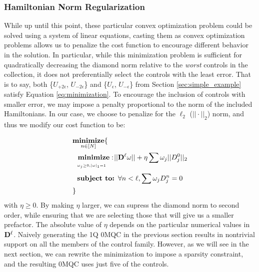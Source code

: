 \documentclass[aps,nofootinbib,pra,notitlepage,twocolumn]{revtex4-1}
\begin{document}


\subsubsection{Hamiltonian Norm Regularization}
\label{sec:norm}
While up until this point, these particular convex optimization problem could be solved using a system of linear equations, casting them as convex optimization problems allows us to penalize the cost function to encourage different behavior in the solution. In particular, while this minimization problem is sufficient for quadratically decreasing the diamond norm relative to the \textit{worst} controls in the collection, it does not preferentially select the controls with the least error. That is to say, both \{$U_{+2\epsilon}$, $U_{-2\epsilon}$\} and \{$U_{\epsilon}$, $U_{-\epsilon}$\} from Section \ref{sec:simple_example} satisfy Equation \ref{eq:minimization}. To encourage the inclusion of controls with smaller error, we may impose a penalty proportional to the norm of the included Hamiltonians. In our case, we choose to penalize for the $\ell_2$ ($||\cdot||_2$) norm, and thus we modify our cost function to be:

\newcommand{\bunderbrace}[2]{%
  \begin{array}[t]{@{}c@{}}
  #1\\
  \parbox{\widthof{#1}}{$\scriptscriptstyle#2$}
  \end{array}
}

\begin{equation}\label{eq:minimization_l2}
\begin{split}
&\underset{n\in[N]}{\textbf{minimize}}\{\\
&\ \ \bunderbrace{\textbf{minimize}: }{\omega_j\geq0, |\omega|_1=1} ||{\bold{D}^{\ell}}\omega||+ \eta\sum\omega_j||D^0_j||_2\\
&\ \ \textbf{subject to: } \forall n<\ell, \sum \omega_jD_j^n=0\\
&\}
\end{split}
\end{equation}
with $\eta \geq 0$. By making $\eta$ larger, we can supress the diamond norm to second order, while ensuring that we are selecting those that will give us a smaller prefactor. The absolute value of $\eta$ depends on the particular numerical values in $\bold{D}^\ell$. Naively generating the 1Q 0MQC in the previous section results in nontrivial support on all the members of the control family. However, as we will see in the next section, we can rewrite the minimization to impose a sparsity constraint, and the resulting 0MQC uses just five of the controls. 
\end{document}
